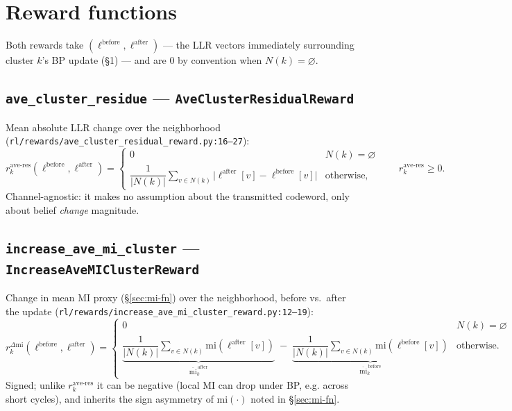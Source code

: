 \documentclass[11pt]{article}
\newcommand{\code}[1]{\texttt{#1}}
\newcommand{\file}[1]{\texttt{#1}}
\begin{document}
\section{Reward functions}

Both rewards take $(\ell^{\mathrm{before}}, \ell^{\mathrm{after}})$ — the LLR vectors
immediately surrounding cluster $k$'s BP update (\S1) — and are $0$ by convention when
$N(k)=\varnothing$.

\subsection{\code{ave\_cluster\_residue} --- \code{AveClusterResidualReward}}
Mean absolute LLR change over the neighborhood
(\file{rl/rewards/ave\_cluster\_residual\_reward.py:16--27}):
\[
r_k^{\mathrm{ave\text{-}res}}(\ell^{\mathrm{before}}, \ell^{\mathrm{after}}) =
\begin{cases}
0 & N(k)=\varnothing \\[2pt]
\dfrac{1}{|N(k)|}\displaystyle\sum_{v\in N(k)} \big|\ell^{\mathrm{after}}[v] - \ell^{\mathrm{before}}[v]\big| & \text{otherwise,}
\end{cases}
\qquad r_k^{\mathrm{ave\text{-}res}} \ge 0.
\]
Channel-agnostic: it makes no assumption about the transmitted codeword, only about
belief \emph{change} magnitude.

\subsection{\code{increase\_ave\_mi\_cluster} --- \code{IncreaseAveMIClusterReward}}
\label{sec:reward-mi}
Change in mean MI proxy (\S\ref{sec:mi-fn}) over the neighborhood, before vs.\ after
the update (\file{rl/rewards/increase\_ave\_mi\_cluster\_reward.py:12--19}):
\[
r_k^{\Delta\mathrm{mi}}(\ell^{\mathrm{before}}, \ell^{\mathrm{after}}) =
\begin{cases}
0 & N(k)=\varnothing \\[4pt]
\underbrace{\dfrac{1}{|N(k)|}\!\!\sum_{v\in N(k)}\!\! \mathrm{mi}(\ell^{\mathrm{after}}[v])}_{\overline{\mathrm{mi}}^{\,\mathrm{after}}_k}
\;-\;
\underbrace{\dfrac{1}{|N(k)|}\!\!\sum_{v\in N(k)}\!\! \mathrm{mi}(\ell^{\mathrm{before}}[v])}_{\overline{\mathrm{mi}}^{\,\mathrm{before}}_k}
& \text{otherwise.}
\end{cases}
\]
Signed; unlike $r_k^{\mathrm{ave\text{-}res}}$ it can be negative (local MI can drop
under BP, e.g. across short cycles), and inherits the sign asymmetry of $\mathrm{mi}(\cdot)$
noted in \S\ref{sec:mi-fn}.
\end{document}
